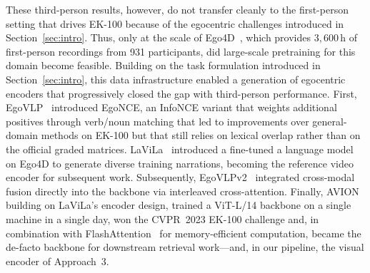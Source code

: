 These third-person results, however, do not transfer cleanly to the first-person setting that drives EK-100 because of the egocentric challenges introduced in Section~\ref{sec:intro}. Thus, only at the scale of Ego4D~\cite{grauman2022ego4d}, which provides $3{,}600$\,h of first-person recordings from 931 participants, did large-scale pretraining for this domain become feasible. Building on the task formulation introduced in Section~\ref{sec:intro}, this data infrastructure enabled a generation of egocentric encoders that progressively closed the gap with third-person performance. First, EgoVLP~\cite{lin2022egovlp} introduced EgoNCE, an InfoNCE variant that weights additional positives through verb/noun matching that led to improvements over general-domain methods on EK-100 but that still relies on lexical overlap rather than on the official graded matrices. LaViLa~\cite{zhao2023lavila} introduced a  fine-tuned a language model on Ego4D to generate diverse training narrations, becoming the reference video encoder for subsequent work. Subsequently, EgoVLPv2~\cite{pramanick2023egovlpv2} integrated cross-modal fusion directly into the backbone via interleaved cross-attention. Finally, AVION~\cite{zhao2023avion} building on LaViLa's encoder design, trained a ViT-L/14 backbone on a single machine in a single day, won the CVPR~2023 EK-100 challenge and, in combination with FlashAttention~\cite{dao2022flashattention} for memory-efficient computation, became the de-facto backbone for downstream retrieval work---and, in our pipeline, the visual encoder of Approach~3.

